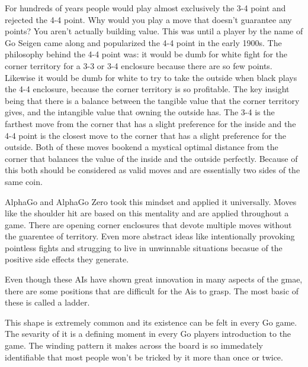 \documentclass[12pt]{IEEEtran}
\begin{document}
\par For hundreds of years people would play almost exclusively the 3-4 point and rejected the 4-4 point. Why would you play a move that doesn't guarantee any points? You aren't actually building value. This was until  a player by the name of Go Seigen came along and popularized the 4-4 point in the early 1900s. The philosophy behind the 4-4 point was: it would be dumb for white fight for the corner territory for a 3-3 or 3-4 enclosure because there are so few points. Likewise it would be dumb for white to try to take the outside when black plays the 4-4 enclosure, because the corner territory is so profitable. The key insight being that there is a balance between the tangible value that the corner territory gives, and the intangible value that owning the outside has. The 3-4 is the farthest move from the corner that has a slight preference for the inside and the 4-4 point is the closest move to the corner that has a slight preference for the outside. Both of these moves bookend a mystical optimal distance from the corner that balances the value of the inside and the outside perfectly. Because of this both should be considered as valid moves and are essentially two sides of the same coin. 

\par AlphaGo and AlphaGo Zero took this mindset and applied it universally. Moves like the shoulder hit are based on this mentality and are applied throughout a game. There are opening corner enclosures that devote multiple moves without the guarentee of territory. Even more abstract ideas like intentionally provoking pointless fights and strugging to live in unwinnable situations becasue of the positive side effects they generate. 


\par Even though these AIs have shown great innovation in many aspects of the gmae, there are some positions that are difficult for the Ais to grasp. The most basic of these is called a ladder. 


\par This shape is extremely common and its existence can be felt in every Go game. The sevarity of it is a defining moment in every Go players introduction to the game. The winding pattern it makes across the board is so immedately identifiable that most people won't be tricked by it more than once or twice. 
\end{document}
